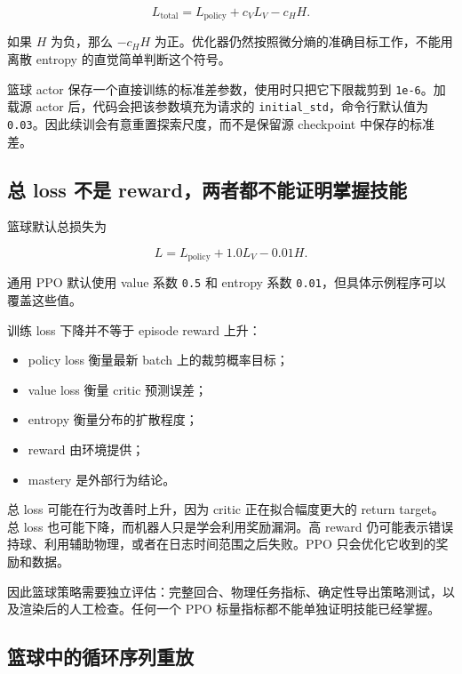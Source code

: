 \documentclass[
  chinese,
  11pt,
  letterpaper,
]{article}
\providecommand{\tightlist}{%
  \setlength{\itemsep}{0pt}\setlength{\parskip}{0pt}}
\begin{document}
\[
L_{\mathrm{total}}
=
L_{\mathrm{policy}}
+c_VL_V
-c_HH.
\]

如果 \(H\) 为负，那么 \(-c_HH\)
为正。优化器仍然按照微分熵的准确目标工作，不能用离散 entropy
的直觉简单判断这个符号。

篮球 actor 保存一个直接训练的标准差参数，使用时只把它下限裁剪到
\texttt{1e-6}。加载源 actor 后，代码会把该参数填充为请求的
\texttt{initial\_std}，命令行默认值为
\texttt{0.03}。因此续训会有意重置探索尺度，而不是保留源 checkpoint
中保存的标准差。

\subsection{总 loss 不是
reward，两者都不能证明掌握技能}\label{ux603b-loss-ux4e0dux662f-rewardux4e24ux8005ux90fdux4e0dux80fdux8bc1ux660eux638cux63e1ux6280ux80fd}

篮球默认总损失为

\[
L
=
L_{\mathrm{policy}}
+1.0L_V
-0.01H.
\]

通用 PPO 默认使用 value 系数 \texttt{0.5} 和 entropy 系数
\texttt{0.01}，但具体示例程序可以覆盖这些值。

训练 loss 下降并不等于 episode reward 上升：

\begin{itemize}
\tightlist
\item
  policy loss 衡量最新 batch 上的裁剪概率目标；
\item
  value loss 衡量 critic 预测误差；
\item
  entropy 衡量分布的扩散程度；
\item
  reward 由环境提供；
\item
  mastery 是外部行为结论。
\end{itemize}

总 loss 可能在行为改善时上升，因为 critic 正在拟合幅度更大的 return
target。总 loss 也可能下降，而机器人只是学会利用奖励漏洞。高 reward
仍可能表示错误持球、利用辅助物理，或者在日志时间范围之后失败。PPO
只会优化它收到的奖励和数据。

因此篮球策略需要独立评估：完整回合、物理任务指标、确定性导出策略测试，以及渲染后的人工检查。任何一个
PPO 标量指标都不能单独证明技能已经掌握。

\subsection{篮球中的循环序列重放}\label{ux7beeux7403ux4e2dux7684ux5faaux73afux5e8fux5217ux91cdux653e}
\end{document}
